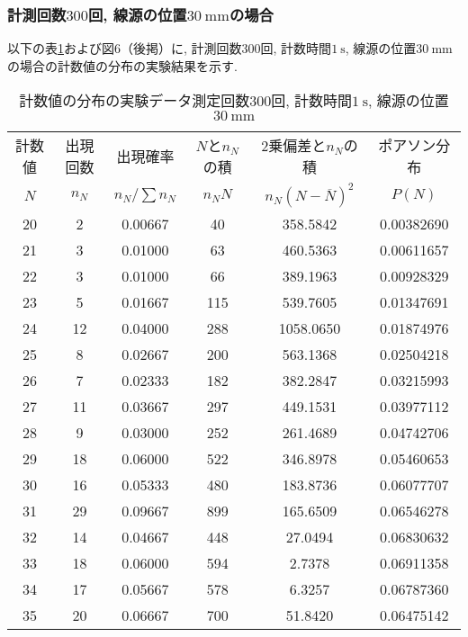 \documentclass{jarticle}
\begin{document}
\subsubsection{計測回数$300$回, 線源の位置$30\ \mathrm{mm}$の場合}

以下の表\ref{tb:count-distribution-30mm-300times}および図6（後掲）に, 計測回数$300$回, 計数時間$1\ \mathrm{s}$, 線源の位置$30\ \mathrm{mm}$の場合の計数値の分布の実験結果を示す.

\begin{table}[H]
  \caption{計数値の分布の実験データ\protect\linebreak 測定回数$300$回, 計数時間$1\ \mathrm{s}$, 線源の位置$30\ \mathrm{mm}$}
  \label{tb:count-distribution-30mm-300times}
  \hspace{-1cm}
  \begin{tabular}{cccccc}
    \hline
    計数値 & 出現回数 & 出現確率 & $N$と$n_N$の積 & 2乗偏差と$n_N$の積 & ポアソン分布 \\
    $N$ & $n_N$ & $n_N/\sum n_N$ & $n_N N$ & $n_N(N-\overline{N})^2$ & $P(N)$ \\
    \hline
    20 & 2 & 0.00667 & 40 & 358.5842 & 0.00382690 \\
    21 & 3 & 0.01000 & 63 & 460.5363 & 0.00611657 \\
    22 & 3 & 0.01000 & 66 & 389.1963 & 0.00928329 \\
    23 & 5 & 0.01667 & 115 & 539.7605 & 0.01347691 \\
    24 & 12 & 0.04000 & 288 & 1058.0650 & 0.01874976 \\
    25 & 8 & 0.02667 & 200 & 563.1368 & 0.02504218 \\
    26 & 7 & 0.02333 & 182 & 382.2847 & 0.03215993 \\
    27 & 11 & 0.03667 & 297 & 449.1531 & 0.03977112 \\
    28 & 9 & 0.03000 & 252 & 261.4689 & 0.04742706 \\
    29 & 18 & 0.06000 & 522 & 346.8978 & 0.05460653 \\
    30 & 16 & 0.05333 & 480 & 183.8736 & 0.06077707 \\
    31 & 29 & 0.09667 & 899 & 165.6509 & 0.06546278 \\
    32 & 14 & 0.04667 & 448 & 27.0494 & 0.06830632 \\
    33 & 18 & 0.06000 & 594 & 2.7378 & 0.06911358 \\
    34 & 17 & 0.05667 & 578 & 6.3257 & 0.06787360 \\
    35 & 20 & 0.06667 & 700 & 51.8420 & 0.06475142 \\

\end{tabular}
\end{table}
\end{document}
